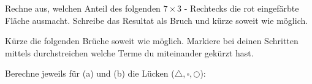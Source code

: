 \documentclass[12pt]{exam}
\begin{document}
\begin{questions}
\question[3]
Rechne aus, welchen Anteil des folgenden $7\times3$ - Rechtecks die rot eingefärbte Fläche ausmacht. Schreibe das Resultat als Bruch und kürze soweit wie möglich.

\newpage
\question[6]
Kürze die folgenden Brüche soweit wie möglich. Markiere bei deinen Schritten mittels durchstreichen welche Terme du miteinander gekürzt hast.
\begin{parts}
\setlength{\columnsep}{30pt}
\end{parts}
\vspace{15pt}

\newpage
\question[6]
Berechne jeweils für (a) und (b) die Lücken ($\triangle,\square,\bigcirc$):
\vspace{15pt}



\end{questions}
\end{document}
